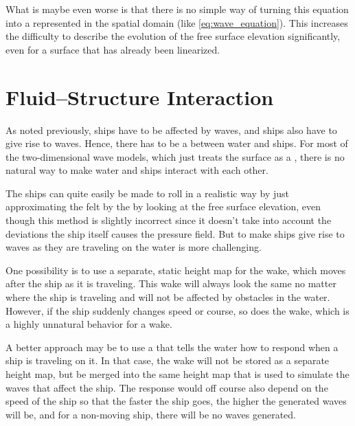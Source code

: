 What is maybe even worse is that there is no simple way of turning this equation into a \PDE represented in the spatial domain (like \eqref{eq:wave_equation}). This increases the difficulty to describe the evolution of the free surface elevation significantly, even for a surface that has already been linearized.

\section{Fluid--Structure Interaction}

As noted previously, ships have to be affected by waves, and ships also have to give rise to waves. Hence, there has to be a  between water and ships. For most of the two-dimensional wave models, which just treats the surface as a , there is no natural way to make water and ships interact with each other.

The ships can quite easily be made to roll in a realistic way by just approximating the  felt by the  by looking at the free surface elevation, even though this method is slightly incorrect since it doesn't take into account the deviations the ship itself causes the pressure field. But to make ships give rise to waves as they are traveling on the water is more challenging.

One possibility is to use a separate, static height map for the wake, which moves after the ship as it is traveling. This wake will always look the same no matter where the ship is traveling and will not be affected by obstacles in the water. However, if the ship suddenly changes speed or course, so does the wake, which is a highly unnatural behavior for a wake.

A better approach may be to use a  that tells the water how to respond when a ship is traveling on it. In that case, the wake will not be stored as a separate height map, but be merged into the same height map that is used to simulate the waves that affect the ship. The response would off course also depend on the speed of the ship so that the faster the ship goes, the higher the generated waves will be, and for a non-moving ship, there will be no waves generated.